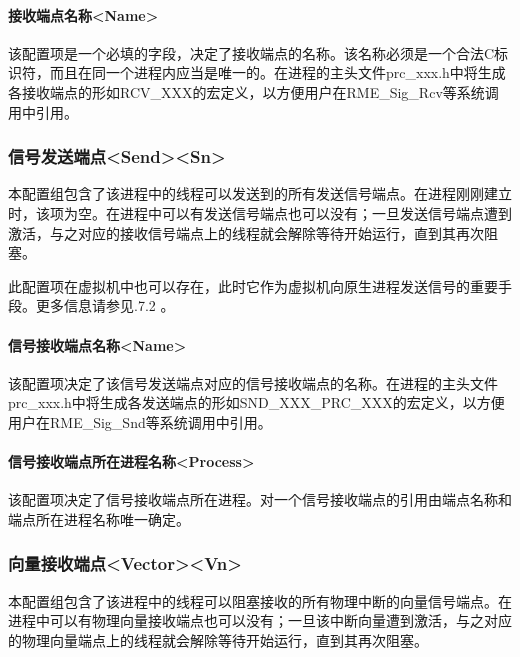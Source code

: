 \paragraph{接收端点名称<Name>{}}\label{par:5-3-14-19-1}

该配置项是一个必填的字段，决定了接收端点的名称。该名称必须是一个合法C标识符，而且在同一个进程内应当是唯一的。在进程的主头文件prc\_xxx.h中将生成各接收端点的形如RCV\_XXX的宏定义，以方便用户在RME\_Sig\_Rcv等系统调用中引用。

\subsubsection{信号发送端点<Send><Sn>{}}\label{subsubsec:5-3-14-20}

本配置组包含了该进程中的线程可以发送到的所有发送信号端点。在进程刚刚建立时，该项为空。在进程中可以有发送信号端点也可以没有；一旦发送信号端点遭到激活，与之对应的接收信号端点上的线程就会解除等待开始运行，直到其再次阻塞。

此配置项在虚拟机中也可以存在，此时它作为虚拟机向原生进程发送信号的重要手段。更多信息请参见.7.2
。

\paragraph{信号接收端点名称<Name>{}}\label{par:5-3-14-20-1}

该配置项决定了该信号发送端点对应的信号接收端点的名称。在进程的主头文件prc\_xxx.h中将生成各发送端点的形如SND\_XXX\_PRC\_XXX的宏定义，以方便用户在RME\_Sig\_Snd等系统调用中引用。

\paragraph{信号接收端点所在进程名称<Process>{}}\label{par:5-3-14-20-2}

该配置项决定了信号接收端点所在进程。对一个信号接收端点的引用由端点名称和端点所在进程名称唯一确定。

\subsubsection{向量接收端点<Vector><Vn>{}}\label{subsubsec:5-3-14-21}

本配置组包含了该进程中的线程可以阻塞接收的所有物理中断的向量信号端点。在进程中可以有物理向量接收端点也可以没有；一旦该中断向量遭到激活，与之对应的物理向量端点上的线程就会解除等待开始运行，直到其再次阻塞。

